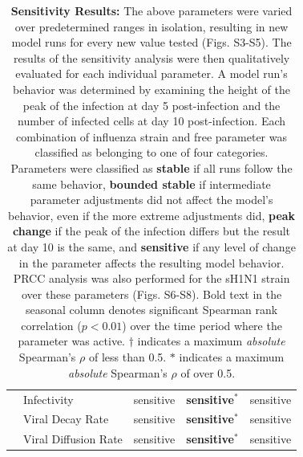\documentclass[preprint,10pt,numbers]{elsarticle}
\begin{document}
\begin{table}[!ht]
\begin{center}
\begin{tabular}{| c | l | c c c |}
  & Infectivity & \cellcolor{red!40}sensitive & \cellcolor{red!40}\textbf{sensitive$^*$} & \cellcolor{red!40}sensitive \\
  & Viral Decay Rate & \cellcolor{red!40}sensitive & \cellcolor{red!40}\textbf{sensitive$^*$} & \cellcolor{red!40}sensitive \\
  & Viral Diffusion Rate & \cellcolor{red!40}sensitive & \cellcolor{red!40}\textbf{sensitive$^*$} & \cellcolor{red!40}sensitive \\
  \hline  
\end{tabular}
\caption{\textbf{Sensitivity Results:} The above parameters were varied over predetermined ranges in isolation, resulting in new model runs for every new value tested (Figs. S3-S5).  The results of the sensitivity analysis were then qualitatively evaluated for each individual parameter.  A model run's behavior was determined by examining the height of the peak of the infection at day 5 post-infection and the number of infected cells at day 10 post-infection.  Each combination of influenza strain and free parameter was classified as belonging to one of four categories.  Parameters were classified as \textbf{stable} if all runs follow the same behavior, \textbf{bounded stable} if intermediate parameter adjustments did not affect the model's behavior, even if the more extreme adjustments did, \textbf{peak change} if the peak of the infection differs but the result at day 10 is the same, and \textbf{sensitive} if any level of change in the parameter affects the resulting model behavior.  PRCC analysis was also performed for the sH1N1 strain over these parameters (Figs. S6-S8).  Bold text in the seasonal column denotes significant Spearman rank correlation ($p < 0.01$) over the time period where the parameter was active. $\dagger$ indicates a maximum \textit{absolute} Spearman's $\rho$ of less than 0.5.  $*$ indicates a maximum \textit{absolute} Spearman's $\rho$ of over 0.5.}
\label{tab:sensitivity}
\end{center}
\end{table}
\end{document}
